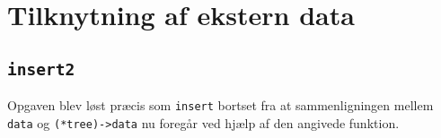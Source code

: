 \section{Tilknytning af ekstern data}
\subsection{\tt insert2}
Opgaven blev løst præcis som {\tt insert} bortset fra at sammenligningen mellem
{\tt data} og {\tt (*tree)->data} nu foregår ved hjælp af den angivede funktion.
